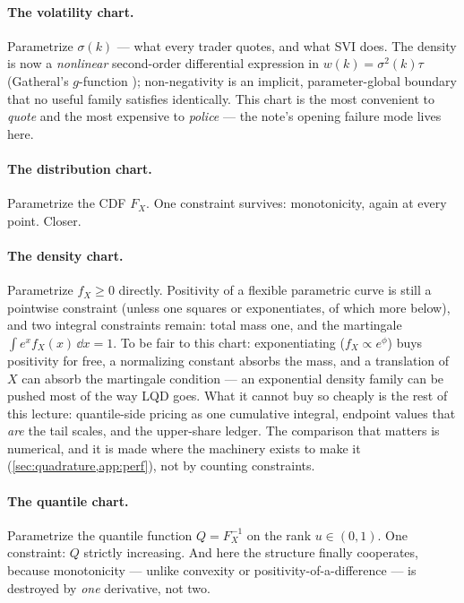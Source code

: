 \documentclass[11pt]{article}
\begin{document}
\paragraph{The volatility chart.}  Parametrize $\sigma(k)$ --- what every
trader quotes, and what SVI does.  The density is now a \emph{nonlinear}
second-order differential expression in $w(k)=\sigma^{2}(k)\tau$ (Gatheral's
$g$-function \cite{Gatheral2006,GatheralJacquier2014}); non-negativity is an
implicit, parameter-global boundary that no useful family satisfies
identically.  This chart is the most convenient to \emph{quote} and the most
expensive to \emph{police} --- the note's opening failure mode lives here.

\paragraph{The distribution chart.}  Parametrize the CDF $F_X$.  One
constraint survives: monotonicity, again at every point.  Closer.

\paragraph{The density chart.}  Parametrize $f_X\ge0$ directly.  Positivity
of a flexible parametric curve is still a pointwise constraint (unless one
squares or exponentiates, of which more below), and two integral constraints
remain: total mass one, and the martingale $\int e^{x}f_X(x)\,\dd x=1$.  To
be fair to this chart: exponentiating ($f_X\propto e^{\phi}$) buys
positivity for free, a normalizing constant absorbs the mass, and a
translation of $X$ can absorb the martingale condition --- an exponential
density family can be pushed most of the way LQD goes.  What it cannot buy
so cheaply is the rest of this lecture: quantile-side pricing as one
cumulative integral, endpoint values that \emph{are} the tail scales, and
the upper-share ledger.  The comparison that matters is numerical, and it is
made where the machinery exists to make it (\cref{sec:quadrature,app:perf}),
not by counting constraints.

\paragraph{The quantile chart.}  Parametrize the quantile function
$Q=F_X^{-1}$ on the rank $u\in(0,1)$.  One constraint: $Q$ strictly
increasing.  And here the structure finally cooperates, because monotonicity
--- unlike convexity or positivity-of-a-difference --- is destroyed by
\emph{one} derivative, not two.
\end{document}
